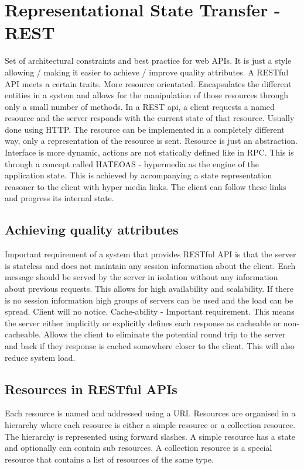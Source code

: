 \section{Representational State Transfer - REST}
Set of architectural constraints and best practice for web APIs. It is just a style allowing / making it easier to achieve / improve quality attributes.
A RESTful API meets a certain traits.
More resource orientated.
Encapsulates the different entities in a system and allows for the manipulation of those resources through only a small number of methods.
In a REST api, a client requests a named resource and the server responds with the current state of that resource.
Usually done using HTTP. The resource can be implemented in a completely different way, only a representation of the resource is sent.
Resource is just an abstraction.
Interface is more dynamic, actions are not statically defined like in RPC.
This is through a concept called HATEOAS - hypermedia as the engine of the application state.
This is achieved by accompanying a state representation reasoner to the client with hyper media links.
The client can follow these links and progress its internal state.

\subsection{Achieving quality attributes}
Important requirement of a system that provides RESTful API is that the server is stateless and does not maintain any session information about the client.
Each message should be served by the server in isolation without any information about previous requests.
This allows for high availability and scalability.
If there is no session information high groups of servers can be used and the load can be spread. Client will no notice.
Cache-ability - Important requirement.
This means the server either implicitly or explicitly defines each response as cacheable or non-cacheable.
Allows the client to eliminate the potential round trip to the server and back if they response is cached somewhere closer to the client.
This will also reduce system load.

\subsection{Resources in RESTful APIs}
Each resource is named and addressed using a URI.
Resources are organised in a hierarchy where each resource is either a simple resource or a collection resource.
The hierarchy is represented using forward slashes.
A simple resource has a state and optionally can contain sub resources.
A collection resource is a special resource that contains a list of resources of the same type.

